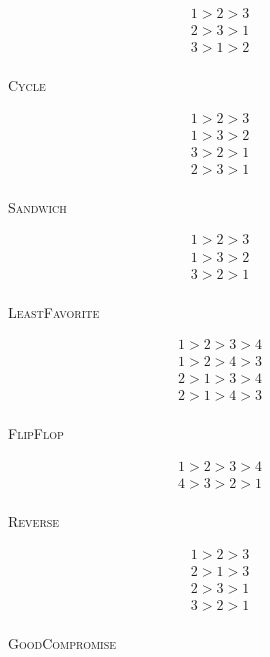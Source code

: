\documentclass[12pt]{article}
\newcommand{\1}[1]{\mathds{1}[{#1}]}
\begin{document}
  \begin{wrapfigure}{r}{0.2\textwidth}
    \begin{center}
      \vspace{-0.5in}
      \begin{align*}
        1 > 2 > 3 \\
        2 > 3 > 1 \\
        3 > 1 > 2 \\
      \end{align*}
      \caption*{\textsc{Cycle}}
      \vspace{-0.25in}
      \begin{align*}
        1 > 2 > 3 \\
        1 > 3 > 2 \\
        3 > 2 > 1 \\
        2 > 3 > 1 \\
      \end{align*}
      \caption*{\textsc{Sandwich}}
      \vspace{-0.25in}
      \begin{align*}
        1 > 2 > 3 \\
        1 > 3 > 2 \\
        3 > 2 > 1 \\
      \end{align*}
      \caption*{\textsc{LeastFavorite}}
      \vspace{-0.25in}
      \begin{align*}
        1 > 2 > 3 > 4 \\
        1 > 2 > 4 > 3 \\
        2 > 1 > 3 > 4 \\
        2 > 1 > 4 > 3 \\
      \end{align*}
      \caption*{\textsc{FlipFlop}}
      \vspace{-0.25in}
      \begin{align*}
        1 > 2 > 3 > 4 \\
        4 > 3 > 2 > 1 \\
      \end{align*}
      \caption*{\textsc{Reverse}}
      \vspace{-0.25in}
      \begin{align*}
        1 > 2 > 3 \\
        2 > 1 > 3 \\
        2 > 3 > 1 \\
        3 > 2 > 1 \\
      \end{align*}
      \caption*{\textsc{GoodCompromise}}
    \end{center}
  \end{wrapfigure}
\end{document}
